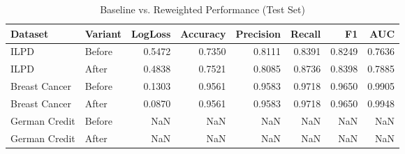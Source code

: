 \begin{table}
\caption{Baseline vs. Reweighted Performance (Test Set)}
\label{tab:perf}
\begin{tabular}{llrrrrrr}
\toprule
Dataset & Variant & LogLoss & Accuracy & Precision & Recall & F1 & AUC \\
\midrule
ILPD & Before & 0.5472 & 0.7350 & 0.8111 & 0.8391 & 0.8249 & 0.7636 \\
ILPD & After & 0.4838 & 0.7521 & 0.8085 & 0.8736 & 0.8398 & 0.7885 \\
Breast Cancer & Before & 0.1303 & 0.9561 & 0.9583 & 0.9718 & 0.9650 & 0.9905 \\
Breast Cancer & After & 0.0870 & 0.9561 & 0.9583 & 0.9718 & 0.9650 & 0.9948 \\
German Credit & Before & NaN & NaN & NaN & NaN & NaN & NaN \\
German Credit & After & NaN & NaN & NaN & NaN & NaN & NaN \\
\bottomrule
\end{tabular}
\end{table}
